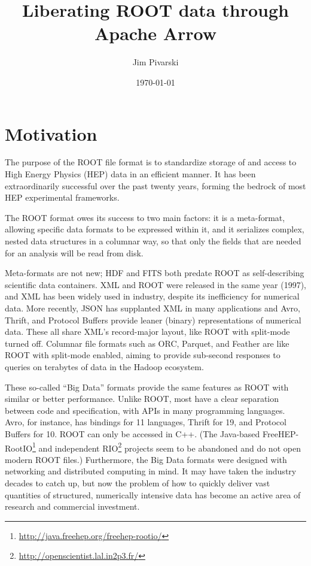 \documentclass{article}
\title{Liberating ROOT data through Apache Arrow}
\author{Jim Pivarski}
\date{\today}
\begin{document}
\maketitle

\section*{Motivation}

The purpose of the ROOT file format is to standardize storage of and access to High Energy Physics (HEP) data in an efficient manner. It has been extraordinarily successful over the past twenty years, forming the bedrock of most HEP experimental frameworks.

The ROOT format owes its success to two main factors: it is a meta-format, allowing specific data formats to be expressed within it, and it serializes complex, nested data structures in a columnar way, so that only the fields that are needed for an analysis will be read from disk.

Meta-formats are not new; HDF and FITS both predate ROOT as self-describing scientific data containers. XML and ROOT were released in the same year (1997), and XML has been widely used in industry, despite its inefficiency for numerical data. More recently, JSON has supplanted XML in many applications and Avro, Thrift, and Protocol Buffers provide leaner (binary) representations of numerical data. These all share XML's record-major layout, like ROOT with split-mode turned off. Columnar file formats such as ORC, Parquet, and Feather are like ROOT with split-mode enabled, aiming to provide sub-second responses to queries on terabytes of data in the Hadoop ecosystem.

These so-called ``Big Data'' formats provide the same features as ROOT with similar or better performance. Unlike ROOT, most have a clear separation between code and specification, with APIs in many programming languages. Avro, for instance, has bindings for 11 languages, Thrift for 19, and Protocol Buffers for 10. ROOT can only be accessed in C++. (The Java-based FreeHEP-RootIO\footnote{\url{http://java.freehep.org/freehep-rootio/}} and independent RIO\footnote{\url{http://openscientist.lal.in2p3.fr/}} projects seem to be abandoned and do not open modern ROOT files.) Furthermore, the Big Data formats were designed with networking and distributed computing in mind. It may have taken the industry decades to catch up, but now the problem of how to quickly deliver vast quantities of structured, numerically intensive data has become an active area of research and commercial investment.
\end{document}
